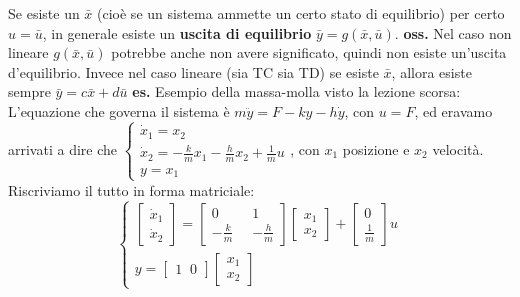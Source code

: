 Se esiste un $\bar{x}$ (cioè se un sistema ammette un certo stato di equilibrio) per certo $u = \bar{u}$, in generale esiste un \textbf{uscita di equilibrio} $\bar{y} = g(\bar{x}, \bar{u})$.\newline
\textbf{oss.} Nel caso non lineare $g(\bar{x}, \bar{u})$ potrebbe anche non avere significato, quindi non esiste un'uscita d'equilibrio. Invece nel caso lineare (sia TC sia TD) se esiste $\bar{x}$, allora esiste sempre $\bar{y} = c \bar{x} + d \bar{u}$\newline
\newline
\textbf{es.} Esempio della massa-molla visto la lezione scorsa:\newline
L'equazione che governa il sistema è $m \ddot{y} = F - ky - h \dot{y}$, con $u = F$, ed eravamo arrivati a dire che $\begin{cases}
    \dot{x}_1 = x_2\\
    \dot{x}_2 = - \frac{k}{m}x_1 - \frac{h}{m}x_2 + \frac{1}{m}u\\
    y = x_1
\end{cases}$, con $x_1$ posizione e $x_2$ velocità.\newline
Riscriviamo il tutto in forma matriciale:
\[
    \begin{cases}
        \left[\begin{matrix}
            \dot{x}_1\\
            \dot{x}_2
        \end{matrix}\right] = \left[\begin{matrix}
            0 \;\; &1\\
            - \frac{k}{m} \;\;& - \frac{h}{m}
        \end{matrix}\right] \left[\begin{matrix}
            x_1\\
            x_2
        \end{matrix}\right] + \left[\begin{matrix}
            0 \\
            \frac{1}{m}
        \end{matrix}\right] u\\
        y = \left[\begin{matrix}
            1 \;\;0
        \end{matrix}\right] \left[\begin{matrix}
            x_1\\
            x_2
        \end{matrix}\right]
    \end{cases}
\]

